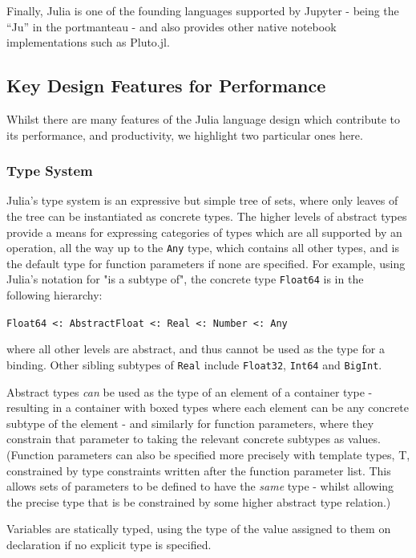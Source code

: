 \documentclass{webofc}
\begin{document}
Finally, Julia is one of the founding languages supported by Jupyter - being the
``Ju'' in the portmanteau - and also provides other native notebook
implementations such as Pluto.jl. 

\subsection{Key Design Features for Performance}

Whilst there are many features of the Julia language design which contribute to its 
performance, and productivity, we highlight two particular ones here.

\subsubsection{Type System}

Julia's type system is an expressive but simple tree of sets, where only leaves 
of the tree can be instantiated as concrete types. The higher levels of abstract
 types provide a means for expressing categories of types which are all supported
 by an operation, all the way up to the \verb$Any$ type, which contains all other
 types, and is the default type for function parameters if none are specified. 
For example, using Julia's notation for "is a subtype of", the concrete type \verb$Float64$
 is in the following hierarchy:

\verb$Float64 <: AbstractFloat <: Real <: Number <: Any$

where all other levels are abstract, and thus cannot be used as the type for a binding.
Other sibling subtypes of \verb$Real$ include \verb$Float32$, \verb$Int64$ and \verb$BigInt$.

Abstract types \textit{can} be used as the type of an element of a container type
 - resulting in a container with boxed types where each element can be any concrete
 subtype of the element - and similarly for function parameters, where they constrain
 that parameter to taking the relevant concrete subtypes as values. (Function
 parameters can also be specified more precisely with template types, T, constrained
by type constraints written after the function parameter list. This allows sets of
parameters to be defined to have the \textit{same} type - whilst allowing the precise
 type that is be constrained by some higher abstract type relation.)

Variables are statically typed, using the type of the value assigned to them on
 declaration if no explicit type is specified.
\end{document}
